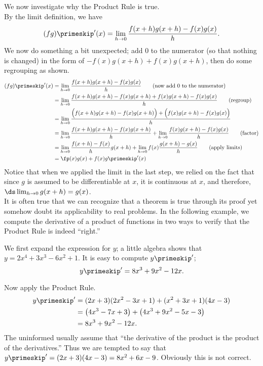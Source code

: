 We now investigate why the Product Rule is true.\\

{By the limit definition, we have 
\[
(fg)\primeskip'(x) =\lim_{h\to0} \frac{f(x+h)g(x+h)-f(x)g(x)}{h}.
\]
We now do something a bit unexpected; add 0 to the numerator (so that nothing is changed) in the form of $-f(x)g(x+h)+f(x)g(x+h)$, then do some regrouping as shown.
		\small
		\begin{align*}
		(fg)\primeskip'(x) &=\lim_{h\to 0} \frac{f(x+h)g(x+h)-f(x)g(x)}{h} \tag{now add 0 to the numerator}\\
  &=	\lim_{h\to 0} \frac{f(x+h)g(x+h)-f(x)g(x+h)+f(x)g(x+h)-f(x)g(x)}{h} \tag{regroup} \\
  &=	\lim_{h\to 0} \frac{\Big(f(x+h)g(x+h)-f(x)g(x+h)\Big)+\Big(f(x)g(x+h)-f(x)g(x)\Big)}{h}\\
  &=	\lim_{h\to 0} \frac{f(x+h)g(x+h)-f(x)g(x+h)}{h}+\lim_{h\to 0}\frac{f(x)g(x+h)-f(x)g(x)}{h} \tag{factor}\\
  &=\lim_{h\to 0} \frac{f(x+h)-f(x)}{h}g(x+h)+\lim_{h\to 0} f(x)\frac{g(x+h)-g(x)}{h}\tag{apply limits}\\
  &=\fp(x)g(x) + f(x)g\primeskip'(x)
		\end{align*}
		\normalsize
Notice that when we applied the limit in the last step, we relied on the fact that since $g$ is assumed to be differentiable at $x$, it is continuous at $x$, and therefore, $\ds \lim_{h\to 0}g(x+h) = g(x)$.
}\\

It is often true that we can recognize that a theorem is true through its proof yet somehow doubt its applicability to real problems. In the following example, we compute the derivative of a product of functions in two ways to verify that the Product Rule is indeed ``right.''\\

{We first expand the expression for $y$; a little algebra shows that $y = 2x^4+3x^3-6x^2+1$. It is easy to compute $y\primeskip'$; 
\[
y\primeskip' = 8x^3+9x^2-12x.
\]

Now apply the Product Rule. 
\begin{align*}
y\primeskip' &= (2x+3)(2x^2-3x+1) + (x^2+3x+1)(4x-3)\\
			 &= \big(4x^3-7x+3\big) + \big(4x^3+9x^2-5x-3\big)\\
			 & = 8x^3+9x^2-12x.
			\end{align*}
The uninformed usually assume that ``the derivative of the product is the product of the derivatives.'' Thus we are tempted to say that $y\primeskip' = (2x+3)(4x-3) = 8x^2+6x-9$. Obviously this is not correct.
}\\

